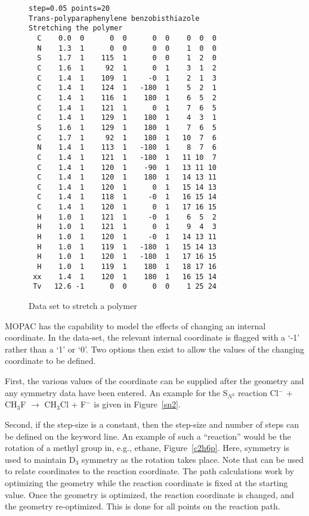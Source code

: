 \begin{figure}
\begin{makeimage}
\end{makeimage}
\begin{verbatim}
step=0.05 points=20
Trans-polyparaphenylene benzobisthiazole
Stretching the polymer
  C    0.0  0      0  0      0  0    0  0  0
  N    1.3  1      0  0      0  0    1  0  0
  S    1.7  1    115  1      0  0    1  2  0
  C    1.6  1     92  1      0  1    3  1  2
  C    1.4  1    109  1     -0  1    2  1  3
  C    1.4  1    124  1   -180  1    5  2  1
  C    1.4  1    116  1    180  1    6  5  2
  C    1.4  1    121  1      0  1    7  6  5
  C    1.4  1    129  1    180  1    4  3  1
  S    1.6  1    129  1    180  1    7  6  5
  C    1.7  1     92  1    180  1   10  7  6
  N    1.4  1    113  1   -180  1    8  7  6
  C    1.4  1    121  1   -180  1   11 10  7
  C    1.4  1    120  1    -90  1   13 11 10
  C    1.4  1    120  1    180  1   14 13 11
  C    1.4  1    120  1      0  1   15 14 13
  C    1.4  1    118  1     -0  1   16 15 14
  C    1.4  1    120  1      0  1   17 16 15
  H    1.0  1    121  1     -0  1    6  5  2
  H    1.0  1    121  1      0  1    9  4  3
  H    1.0  1    120  1     -0  1   14 13 11
  H    1.0  1    119  1   -180  1   15 14 13
  H    1.0  1    120  1   -180  1   17 16 15
  H    1.0  1    119  1    180  1   18 17 16
 xx    1.4  1    120  1    180  1   16 15 14
 Tv   12.6 -1      0  0      0  0    1 25 24
\end{verbatim}
\caption{\label{hook} Data set to stretch a polymer}
\end{figure}

MOPAC has the capability to model the effects of changing an internal
coordinate. In the data-set, the relevant internal coordinate is flagged with a
`-1' rather than a `1' or `0'.  Two options then exist to allow the values of
the changing coordinate to be defined. 

First, the various values of the coordinate can be supplied after the geometry
and any symmetry data have been entered.  An example for the S$_{N^2}$ reaction
Cl$^-$ + CH$_3$F $\rightarrow$ CH$_3$Cl + F$^-$  is given in Figure~\ref{sn2}.

Second, if the step-size is a constant, then the step-size and number of steps
can be defined on the keyword line.  An example of such a ``reaction'' would be
the rotation of a methyl group in, e.g., ethane, Figure~\ref{c2h6p}. Here,
symmetry is used to maintain D$_3$ symmetry as the rotation takes place. Note
that  can be used to relate coordinates to the reaction
coordinate. The path calculations work by optimizing the geometry while the
reaction coordinate is fixed at the starting value.  Once the geometry is
optimized, the reaction coordinate is changed, and the geometry re-optimized. 
This is done for all points on the reaction path.  

